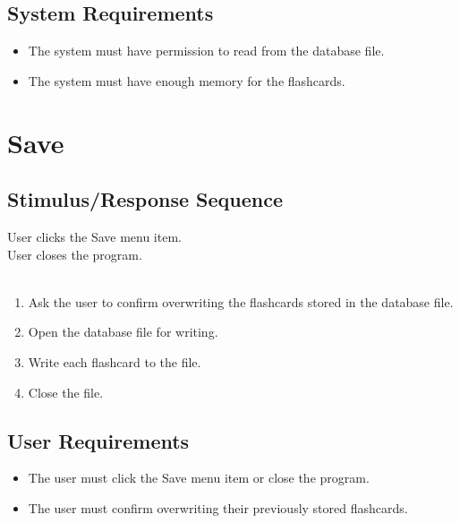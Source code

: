 \documentclass{scrreprt}
\begin{document}
    \subsection{System Requirements}
        \begin{itemize}
            \item The system must have permission to read from the database file.
            \item The system must have enough memory for the flashcards.
        \end{itemize}

\section{Save}
    \subsection{Stimulus/Response Sequence}
        \begin{flushleft}
             User clicks the Save menu item. \\
             User closes the program. \\
             \\
            \begin{enumerate}[1.]
                \item Ask the user to confirm overwriting the flashcards stored in the database file.
                \item Open the database file for writing.
                \item Write each flashcard to the file.
                \item Close the file.
            \end{enumerate}
        \end{flushleft}

    \subsection{User Requirements}
        \begin{itemize}
            \item The user must click the Save menu item or close the program.
            \item The user must confirm overwriting their previously stored flashcards.
        \end{itemize}
\end{document}

